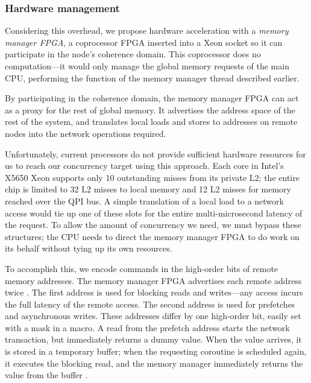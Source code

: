 \documentclass{acm_proc_article-sp}
\begin{document}
\subsubsection{Hardware management}
Considering this overhead, we propose hardware acceleration with a {\em memory manager
  FPGA}, a coprocessor FPGA inserted into a Xeon socket so it can
participate in the node's coherence domain. This coprocessor does no
computation---it would only manage the global memory requests of the
main CPU, performing the function of the memory manager thread
described earlier.

By participating in the coherence domain, the memory manager FPGA can
act as a proxy for the rest of global memory. It advertises the
address space of the rest of the system, and translates local loads
and stores to addresses on remote nodes into the network operations
required.

Unfortunately, current processors do not provide sufficient hardware
resources for us to reach our concurrency target using this
approach. Each core in Intel's X5650 Xeon supports only 10 outstanding
misses from its private L2; the entire chip is limited to 32 L2 misses
to local memory and 12 L2 misses for memory reached over the QPI
bus. A simple translation of a local load to a network access would
tie up one of these slots for the entire multi-microsecond latency of
the request. To allow the amount of concurrency we need, we must bypass these structures; the CPU needs to direct the memory manager FPGA
to do work on its behalf without tying up its own resources.

To accomplish this, we encode commands in the high-order bits of
remote memory addresses. The memory manager FPGA advertises each
remote address twice . The first address is used for blocking reads and
writes---any access incurs the full latency of the remote
access.  The second address is used for
prefetches and asynchronous writes. These addresses differ by one
high-order bit, easily set with a mask in a macro. A read from the
prefetch address starts the network transaction, but immediately
returns a dummy value. When the value arrives, it is stored in a
temporary buffer; when the requesting coroutine is scheduled again, it
executes the blocking read, and the memory manager immediately returns
the value from the buffer . 
\end{document}
